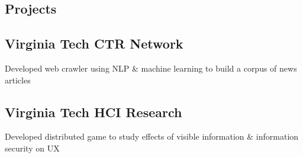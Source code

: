 \documentclass[]{resume}
\begin{document}
\begin{minipage}[t]{0.35\textwidth}
\begin{grayhighlight}
\section{Projects}


\subsection{Virginia Tech CTR Network}
\begin{tightemize}
\item Developed web crawler using NLP \& machine learning to build a corpus of news articles
\end{tightemize}

\subsection{Virginia Tech HCI Research}
\begin{tightemize}
\item Developed distributed game to study effects of visible information \& information security on UX
\end{tightemize}






\end{grayhighlight}
\end{minipage}
\end{document}
